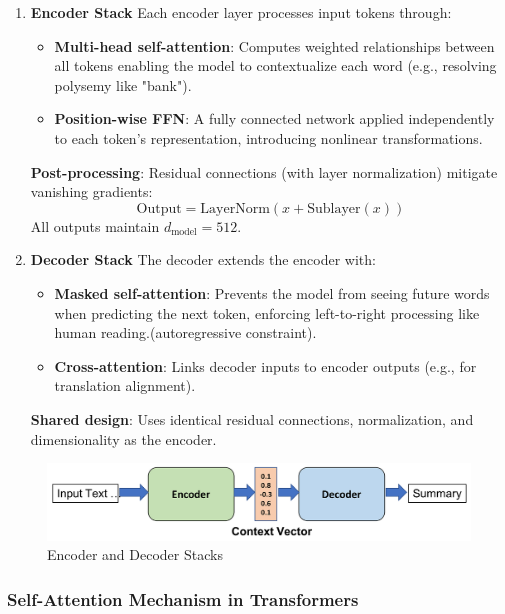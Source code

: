 \begin{enumerate}
	\item \textbf{Encoder Stack}  
	Each encoder layer processes input tokens through:  
	\begin{itemize}
		\item \textbf{Multi-head self-attention}: Computes weighted relationships between all tokens enabling the model to contextualize each word (e.g., resolving polysemy like "bank").  
		\item \textbf{Position-wise FFN}: A fully connected network applied independently to each token’s representation, introducing nonlinear transformations.   
	\end{itemize}
	\textbf{Post-processing}: Residual connections (with layer normalization) mitigate vanishing gradients:  
	\[ \text{Output} = \text{LayerNorm}(x + \text{Sublayer}(x)) \]  
	All outputs maintain \(d_{\text{model}} = 512\).
	
	\item \textbf{Decoder Stack}  
	The decoder extends the encoder with:  
	\begin{itemize}
		\item \textbf{Masked self-attention}: Prevents the model from seeing future words when predicting the next token, enforcing left-to-right processing like human reading.(autoregressive constraint).  
		\item \textbf{Cross-attention}: Links decoder inputs to encoder outputs (e.g., for translation alignment).  
	\end{itemize}
	\textbf{Shared design}: Uses identical residual connections, normalization, and dimensionality as the encoder.
\end{enumerate}
\begin{figure}[htbp]
	
	\centerline{\includegraphics[width=.8\linewidth]{
			Figures/incoderDecoder.png}}
	\caption{Encoder and Decoder Stacks}
	\label{incoderDecoder.png}
	
\end{figure}
\subsubsection{Self-Attention Mechanism in Transformers}

